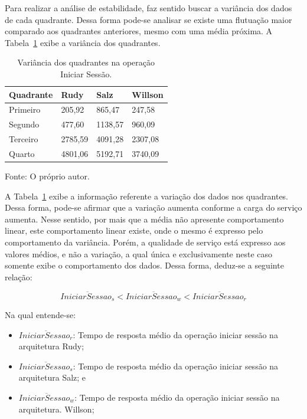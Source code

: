 Para realizar a análise de estabilidade, faz sentido buscar a variância dos dados de cada quadrante.
%
Dessa forma pode-se analisar se existe uma flutuação maior comparado aos quadrantes anteriores, mesmo com uma média próxima.
%
A Tabela~\ref{tab:op_start_session_var} exibe a variância dos quadrantes.


\begin{table}[htb!]
\centering
\begin{adjustbox}{max width=\textwidth}
\caption{Variância dos quadrantes na operação Iniciar Sessão.}
\label{tab:op_start_session_var}
\begin{tabular}{l|l|l|l}

\hline \hline

Quadrante & Rudy    & Salz    & Willson \\ \hline \hline

Primeiro  & 205,92 & 865,47 & 247,58 \\ \hline

Segundo   & 477,60 & 1138,57 & 960,09 \\ \hline

Terceiro  & 2785,59 & 4091,28 & 2307,08 \\ \hline

Quarto    & 4801,06 & 5192,71 & 3740,09 \\ \hline \hline

\end{tabular}

\end{adjustbox}

Fonte: O próprio autor.
\end{table}

A Tabela~\ref{tab:op_start_session_var} exibe a informação referente a variação dos dados nos quadrantes.
%
Dessa forma, pode-se afirmar que a variação aumenta conforme a carga do serviço aumenta.
%
Nesse sentido, por mais que a média não apresente comportamento linear, este comportamento linear existe, onde o mesmo é expresso pelo comportamento da variância.
%
Porém, a qualidade de serviço está expresso aos valores médios, e não a variação, a qual única e exclusivamente neste caso somente exibe o comportamento dos dados.
%
Dessa forma, deduz-se a seguinte relação:

$$
  \overline{IniciarSessao_{s}} < \overline{IniciarSessao_{w}} <\overline{IniciarSessao_{r}}
$$

Na qual entende-se:

\begin{itemize}
 \item $\overline{IniciarSessao_{r}}$: Tempo de resposta médio da operação iniciar sessão na arquitetura Rudy;
 \item $\overline{IniciarSessao_{s}}$: Tempo de resposta médio da operação iniciar sessão na arquitetura Salz; e
 \item $\overline{IniciarSessao_{w}}$: Tempo de resposta médio da operação iniciar sessão na arquitetura. Willson;
\end{itemize}

